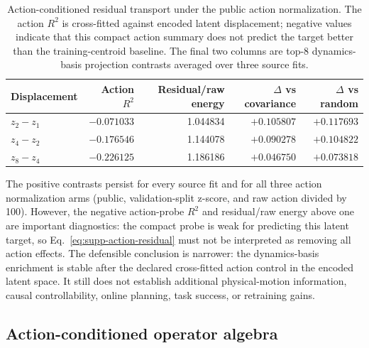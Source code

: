 \documentclass{article}
\begin{document}
\begin{table}[H]
\centering
\scriptsize
\setlength{\tabcolsep}{3pt}
\caption{Action-conditioned residual transport under the public action
normalization. The action $R^2$ is cross-fitted against encoded latent
displacement; negative values indicate that this compact action summary does
not predict the target better than the training-centroid baseline. The final
two columns are top-$8$ dynamics-basis projection contrasts averaged over
three source fits.}
\label{tab:supp-action-residual-transport}
\begin{tabular}{lrrrr}
\toprule
Displacement & Action $R^2$ & Residual/raw energy & $\Delta$ vs covariance & $\Delta$ vs random \\
\midrule
$z_{2}-z_{1}$ & $-0.071033$ & 1.044834 & $+0.105807$ & $+0.117693$ \\
$z_{4}-z_{2}$ & $-0.176546$ & 1.144078 & $+0.090278$ & $+0.104822$ \\
$z_{8}-z_{4}$ & $-0.226125$ & 1.186186 & $+0.046750$ & $+0.073818$ \\
\bottomrule
\end{tabular}
\end{table}

The positive contrasts persist for every source fit and for all three action
normalization arms (public, validation-split z-score, and raw action divided by
100). However, the negative action-probe $R^2$ and residual/raw energy above
one are important diagnostics: the compact probe is weak for predicting this
latent target, so Eq.~\eqref{eq:supp-action-residual} must not be interpreted
as removing all action effects. The defensible conclusion is narrower: the
dynamics-basis enrichment is stable after the declared cross-fitted action
control in the encoded latent space. It still does not establish additional
physical-motion information, causal controllability, online planning, task
success, or retraining gains.

\subsection{Action-conditioned operator algebra}
\label{sec:supp-action-algebra}
\end{document}
